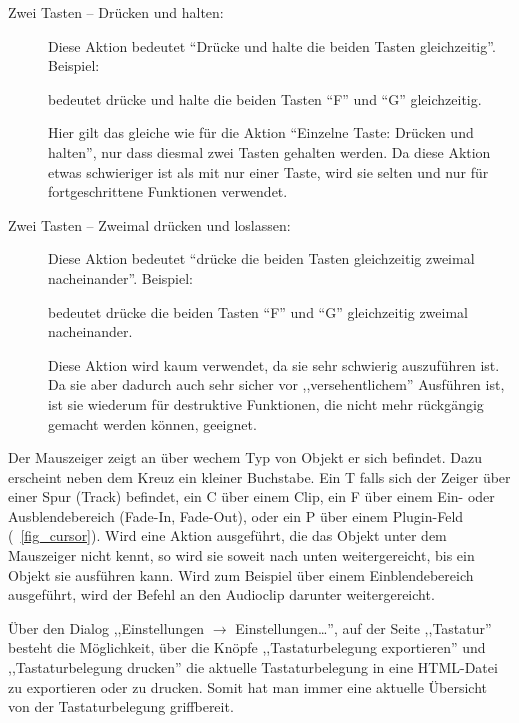 \begin{description}
\item[Zwei Tasten  -- Drücken und halten:]
Diese Aktion bedeutet ``Drücke und halte die beiden Tasten gleichzeitig''. Beispiel:
\begin{quotation}
\end{quotation}
bedeutet drücke und halte die beiden Tasten ``F'' und ``G'' gleichzeitig.

Hier gilt das gleiche wie für die Aktion ``Einzelne Taste: Drücken und halten'', nur dass diesmal zwei Tasten gehalten werden. Da diese Aktion etwas schwieriger ist als mit nur einer Taste, wird sie selten und nur für fortgeschrittene Funktionen verwendet.

\item[Zwei Tasten  -- Zweimal drücken und loslassen:]
Diese Aktion bedeutet ``drücke die beiden Tasten gleichzeitig zweimal nacheinander''.  Beispiel:
\begin{quotation}
\end{quotation}
bedeutet drücke die beiden Tasten ``F'' und ``G'' gleichzeitig zweimal nacheinander.

Diese Aktion wird kaum verwendet, da sie sehr schwierig auszuführen ist. Da sie aber dadurch auch sehr sicher vor ,,versehentlichem'' Ausführen ist, ist sie wiederum für destruktive Funktionen, die nicht mehr rückgängig gemacht werden können, geeignet.
\end{description}

Der Mauszeiger zeigt an über wechem Typ von Objekt er sich befindet. Dazu erscheint neben dem Kreuz ein kleiner Buchstabe. Ein T falls sich der Zeiger über einer Spur (Track) befindet, ein C über einem Clip, ein F über einem Ein- oder Ausblendebereich (Fade-In, Fade-Out), oder ein P über einem Plugin-Feld (\FigB~\ref{fig_cursor}). Wird eine Aktion ausgeführt, die das Objekt unter dem Mauszeiger nicht kennt, so wird sie soweit nach unten weitergereicht, bis ein Objekt sie ausführen kann. Wird zum Beispiel über einem Einblendebereich  ausgeführt, wird der Befehl an den Audioclip darunter weitergereicht.

Über den Dialog ,,Einstellungen $\rightarrow$ Einstellungen\dots'', auf der Seite ,,Tastatur'' besteht die Möglichkeit, über die Knöpfe ,,Tastaturbelegung exportieren'' und ,,Tastaturbelegung drucken'' die aktuelle Tastaturbelegung in eine HTML-Datei zu exportieren oder zu drucken. Somit hat man immer eine aktuelle Übersicht von der Tastaturbelegung griffbereit.

